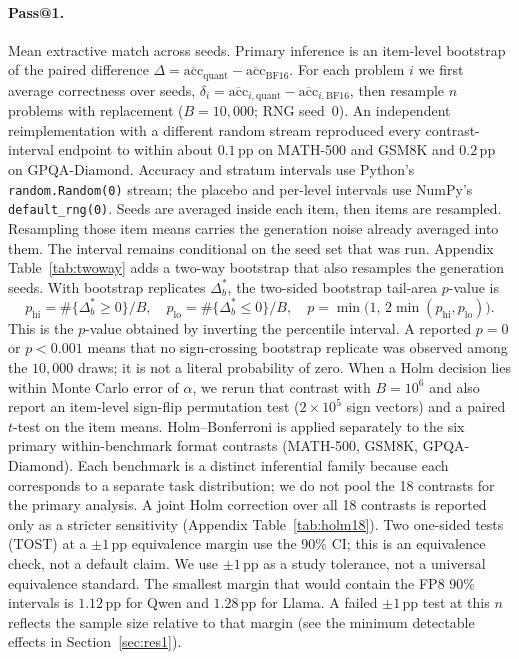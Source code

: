 \documentclass[11pt,a4paper]{article}
\begin{document}
\paragraph{Pass@1.}
Mean extractive match across seeds. Primary inference is an item-level bootstrap of the paired difference $\Delta = \overline{\mathrm{acc}}_{\mathrm{quant}} - \overline{\mathrm{acc}}_{\mathrm{BF16}}$. For each problem $i$ we first average correctness over seeds, $\delta_i=\overline{\mathrm{acc}}_{i,\mathrm{quant}}-\overline{\mathrm{acc}}_{i,\mathrm{BF16}}$, then resample $n$ problems with replacement ($B=10{,}000$; RNG seed~$0$). An independent reimplementation with a different random stream reproduced every contrast-interval endpoint to within about $0.1$\,pp on MATH-500 and GSM8K and $0.2$\,pp on GPQA-Diamond. Accuracy and stratum intervals use Python's \texttt{random.Random(0)} stream; the placebo and per-level intervals use NumPy's \texttt{default\_rng(0)}. Seeds are averaged inside each item, then items are resampled. Resampling those item means carries the generation noise already averaged into them. The interval remains conditional on the seed set that was run. Appendix Table~\ref{tab:twoway} adds a two-way bootstrap that also resamples the generation seeds. With bootstrap replicates $\Delta^*_b$, the two-sided bootstrap tail-area $p$-value is
\begin{equation}
p_{\mathrm{hi}}=\#\{\Delta^*_b\ge 0\}/B,\quad
p_{\mathrm{lo}}=\#\{\Delta^*_b\le 0\}/B,\quad
p=\min\bigl(1,\,2\min(p_{\mathrm{hi}},p_{\mathrm{lo}})\bigr).
\end{equation}
This is the $p$-value obtained by inverting the percentile interval. A reported $p=0$ or $p<0.001$ means that no sign-crossing bootstrap replicate was observed among the $10{,}000$ draws; it is not a literal probability of zero. When a Holm decision lies within Monte Carlo error of $\alpha$, we rerun that contrast with $B=10^6$ and also report an item-level sign-flip permutation test ($2\times 10^5$ sign vectors) and a paired $t$-test on the item means. Holm--Bonferroni is applied separately to the six primary within-benchmark format contrasts (MATH-500, GSM8K, GPQA-Diamond). Each benchmark is a distinct inferential family because each corresponds to a separate task distribution; we do not pool the 18 contrasts for the primary analysis. A joint Holm correction over all 18 contrasts is reported only as a stricter sensitivity (Appendix Table~\ref{tab:holm18}). Two one-sided tests (TOST) at a $\pm 1$\,pp equivalence margin use the 90\% CI; this is an equivalence check, not a default claim. We use $\pm 1$\,pp as a study tolerance, not a universal equivalence standard. The smallest margin that would contain the FP8 90\% intervals is $1.12$\,pp for Qwen and $1.28$\,pp for Llama. A failed $\pm 1$\,pp test at this $n$ reflects the sample size relative to that margin (see the minimum detectable effects in Section~\ref{sec:res1}).
\end{document}
